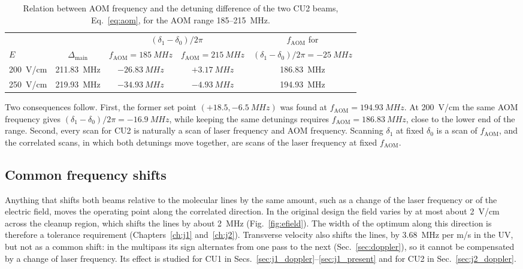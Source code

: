 \documentclass[11pt,a4paper,oneside]{report}
\newcommand{\fAOM}{f_{\mathrm{AOM}}}
\newcommand{\Dmain}{\Delta_{\mathrm{main}}}
\begin{document}
\begin{table}[htbp]
  \centering
  \caption[AOM frequency and detuning difference]{Relation between AOM frequency and the
  detuning difference of the two CU2 beams, Eq.~\eqref{eq:aom}, for the AOM range
  185--\SI{215}{MHz}.}
  \label{tab:aom}
  \small
  \begin{tabular}{lcccc}
    \toprule
    & & \multicolumn{2}{c}{$(\delta_1-\delta_0)/2\pi$} & $\fAOM$ for \\
    \cmidrule(lr){3-4}
    $E$ & $\Dmain$ & $\fAOM=\SI{185}{MHz}$ & $\fAOM=\SI{215}{MHz}$ &
      $(\delta_1-\delta_0)/2\pi=-\SI{25}{MHz}$ \\
    \midrule
    \SI{200}{V/cm} & \SI{211.83}{MHz} & $-\SI{26.83}{MHz}$ & $+\SI{3.17}{MHz}$ & \SI{186.83}{MHz} \\
    \SI{250}{V/cm} & \SI{219.93}{MHz} & $-\SI{34.93}{MHz}$ & $-\SI{4.93}{MHz}$ & \SI{194.93}{MHz} \\
    \bottomrule
  \end{tabular}
\end{table}

Two consequences follow. First, the former set point $(+18.5,-\SI{6.5}{MHz})$ was found at
$\fAOM=\SI{194.93}{MHz}$. At \SI{200}{V/cm} the same AOM frequency gives
$(\delta_1-\delta_0)/2\pi=-\SI{16.9}{MHz}$, while keeping the same detunings requires
$\fAOM=\SI{186.83}{MHz}$, close to the lower end of the range. Second, every scan for CU2 is
naturally a scan of laser frequency and AOM frequency. Scanning $\delta_1$ at fixed $\delta_0$
is a scan of $\fAOM$, and the correlated scans, in which both detunings move together, are
scans of the laser frequency at fixed $\fAOM$.

\subsection{Common frequency shifts}

Anything that shifts both beams relative to the molecular lines by the same amount, such as a
change of the laser frequency or of the electric field, moves the operating point along the
correlated direction. In the original design the field varies by at most about
\SI{2}{V/cm} across the cleanup region, which shifts the lines by about \SI{2}{MHz}
(Fig.~\ref{fig:efield}). The width of the optimum along this direction is therefore a
tolerance requirement (Chapters~\ref{ch:j1} and~\ref{ch:j2}). Transverse velocity also
shifts the lines, by \SI{3.68}{MHz} per m/s in the UV, but not as a common shift: in the
multipass its sign alternates from one pass to the next (Sec.~\ref{sec:doppler}), so it cannot be
compensated by a change of laser frequency. Its effect is studied for CU1 in
Secs.~\ref{sec:j1_doppler}--\ref{sec:j1_present} and for CU2 in Sec.~\ref{sec:j2_doppler}.
\end{document}
